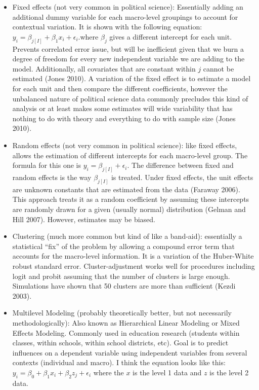 \documentclass[]{book}
\providecommand{\tightlist}{%
  \setlength{\itemsep}{0pt}\setlength{\parskip}{0pt}}
\begin{document}
\begin{itemize}
\tightlist
\item
  Fixed effects (not very common in political science): Essentially
  adding an additional dummy variable for each macro-level groupings to
  account for contextual variation. It is shown with the following
  equation: \(y_i = \beta_{j[I]} + \beta_1x_i + \epsilon_i\).where
  \(\beta_j\) gives a different intercept for each unit. Prevents
  correlated error issue, but will be inefficient given that we burn a
  degree of freedom for every new independent variable we are adding to
  the model. Additionally, all covariates that are constant within \(j\)
  cannot be estimated (Jones 2010). A variation of the fixed effect is
  to estimate a model for each unit and then compare the different
  coefficients, however the unbalanced nature of political science data
  commonly precludes this kind of analysis or at least makes some
  estimates will wide variability that has nothing to do with theory and
  everything to do with sample size (Jones 2010).
\item
  Random effects (not very common in political science): like fixed
  effects, allows the estimation of different intercepts for each
  macro-level group. The formula for this one is
  \(y_i = \beta_{j[I]} + \epsilon_i\). The difference between fixed and
  random effects is the way \(\beta_{j[I]}\) is treated. Under fixed
  effects, the unit effects are unknown constants that are estimated
  from the data (Faraway 2006). This approach treats it as a random
  coefficient by assuming these intercepts are randomly drawn for a
  given (usually normal) distribution (Gelman and Hill 2007). However,
  estimates may be biased.
\item
  Clustering (much more common but kind of like a band-aid): essentially
  a statistical ``fix'' of the problem by allowing a compound error term
  that accounts for the macro-level information. It is a variation of
  the Huber-White robust standard error. Cluster-adjustment works well
  for procedures including logit and probit assuming that the number of
  clusters is large enough. Simulations have shown that 50 clusters are
  more than sufficient (Kezdi 2003).
\item
  Multilevel Modeling (probably theoretically better, but not
  necessarily methodologically): Also known as Hierarchical Linear
  Modeling or Mixed Effects Modeling. Commonly used in education
  research (students within classes, within schools, within school
  districts, etc). Goal is to predict influences on a dependent variable
  using independent variables from several contexts (individual and
  macro). I think the equation looks like this:
  \(y_i = \beta_0 + \beta_1x_i + \beta_2z_j + \epsilon_i\) where the
  \(x\) is the level 1 data and \(z\) is the level 2 data.
\end{itemize}
\end{document}
